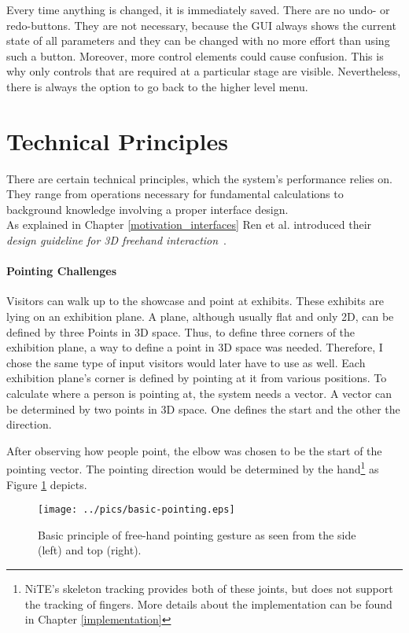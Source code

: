 Every time anything is changed, it is immediately saved. There are no undo- or redo-buttons. They are not necessary, because the \ac{GUI} always shows the current state of all parameters and they can be changed with no more effort than using such a button. Moreover, more control elements could cause confusion. This is why only controls that are required at a particular stage are visible. Nevertheless, there is always the option to go back to the higher level menu.


\section{Technical Principles}
\label{installation_tech}

There are certain technical principles, which the system's performance relies on. They range from operations necessary for fundamental calculations to background knowledge involving a proper interface design.
\\
As explained in Chapter \ref{motivation_interfaces} Ren et al. introduced their \textit{design guideline for 3D freehand interaction}~\cite{FreehandSelectionCnG}.


\paragraph{Pointing Challenges}

Visitors can walk up to the showcase and point at exhibits. These exhibits are lying on an exhibition plane. A plane, although usually flat and only \ac{2D}, can be defined by three Points in \ac{3D} space. Thus, to define three corners of the exhibition plane, a way to define a point in \ac{3D} space was needed. Therefore, I chose the same type of input visitors would later have to use as well. Each exhibition plane's corner is defined by pointing at it from various positions. To calculate where a person is pointing at, the system needs a vector. A vector can be determined by two points in \ac{3D} space. One defines the start and the other the direction.

After observing how people point, the elbow was chosen to be the start of the pointing vector. The pointing direction would be determined by the hand\footnote{NiTE's skeleton tracking provides both of these joints, but does not support the tracking of fingers. More details about the implementation can be found in Chapter \ref{implementation}} as Figure \ref{fig:principle_pointing} depicts.
\begin{figure}[H]%
\texttt{[image: ../pics/basic-pointing.eps]}%
\caption{Basic principle of free-hand pointing gesture as seen from the side (left) and top (right).}%
\label{fig:principle_pointing}%
\end{figure}

